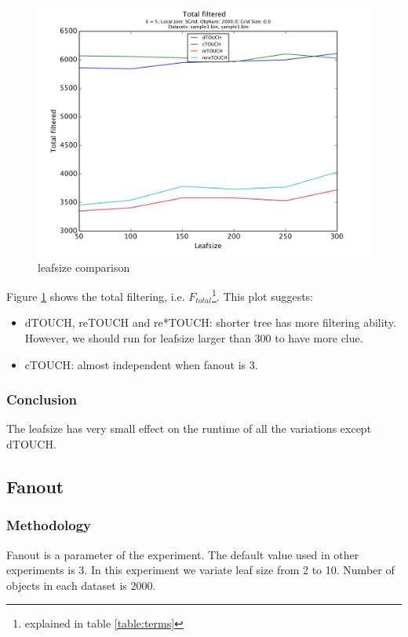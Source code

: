 \documentclass{sig-alternate}
\newcommand{\fref}[1]{Figure \ref{#1}}
\newcommand{\dSJ}{dTOUCH}
\newcommand{\cSJ}{cTOUCH}
\newcommand{\reSJ}{reTOUCH}
\newcommand{\rereSJ}{re*TOUCH}
\begin{document}
\begin{figure}[htb]
    \begin{center}
        \includegraphics[width=\columnwidth]{leafsize/totalfiltered}
        \caption{leafsize comparison}
        \label{fig:leafsize:filter}
      \end{center}
\end{figure}

\fref{fig:leafsize:filter} shows the total filtering, i.e. $F_{total}$\footnote{explained in table \ref{table:terms}}. This plot suggests:
\begin{itemize}
\item {\dSJ}, {\reSJ} and {\rereSJ}: shorter tree has more filtering ability. However, we should run for leafsize larger than 300 to have more clue.
\item {\cSJ}: almost independent when fanout is 3.
\end{itemize}

\subsubsection{Conclusion}

The leafsize has very small effect on the runtime of all the variations except {\dSJ}.

\subsection{Fanout}
\subsubsection{Methodology}
Fanout is a parameter of the experiment. The default value used in other experiments is 3. In this experiment we variate leaf size from 2 to 10. Number of objects in each dataset is 2000.
\end{document}
